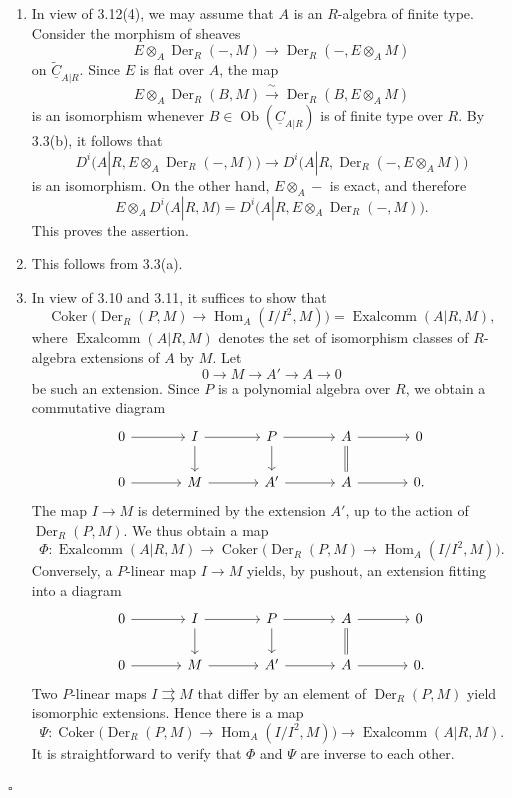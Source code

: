 \begin{enumerate}[label=(\arabic*)]
\item In view of 3.12(4), we may assume that $A$ is an
$R$-algebra of finite type. Consider the morphism of sheaves
\[
 E\otimes_A\operatorname{Der}_R(-,M)
 \longrightarrow
 \operatorname{Der}_R(-,E\otimes_AM)
\]
on $\widetilde{\underline C}_{A|R}$. Since $E$ is flat over $A$,
the map
\[
 E\otimes_A\operatorname{Der}_R(B,M)
 \xrightarrow{\ \sim\ }
 \operatorname{Der}_R(B,E\otimes_AM)
\]
is an isomorphism whenever
$B\in\operatorname{Ob}(\underline C_{A|R})$ is of finite type
over $R$. By 3.3(b), it follows that
\[
 D^i\bigl(A|R,E\otimes_A\operatorname{Der}_R(-,M)\bigr)
 \longrightarrow
 D^i\bigl(A|R,\operatorname{Der}_R(-,E\otimes_AM)\bigr)
\]
is an isomorphism. On the other hand,
$E\otimes_A-$ is exact, and therefore
\[
 E\otimes_AD^i(A|R,M)
 =D^i\bigl(A|R,E\otimes_A\operatorname{Der}_R(-,M)\bigr).
\]
This proves the assertion.

\item This follows from 3.3(a).


\item In view of 3.10 and 3.11, it suffices to show that
\[
 \operatorname{Coker}\bigl(
 \operatorname{Der}_R(P,M)\longrightarrow
 \operatorname{Hom}_A(I/I^2,M)\bigr)
 =\operatorname{Exalcomm}(A|R,M),
\]
where $\operatorname{Exalcomm}(A|R,M)$ denotes the set of
isomorphism classes of $R$-algebra extensions of $A$ by $M$.
Let
\[
 0\longrightarrow M\longrightarrow A'\longrightarrow A
 \longrightarrow0
\]
be such an extension. Since $P$ is a polynomial algebra over $R$,
we obtain a commutative diagram
\[
\begin{tikzcd}[column sep=large]
0 \arrow[r] & I \arrow[r] \arrow[d]
& P \arrow[r] \arrow[d]
& A \arrow[r] \arrow[d,equal] & 0 \\
0 \arrow[r] & M \arrow[r]
& A' \arrow[r]
& A \arrow[r] & 0.
\end{tikzcd}
\]
The map $I\longrightarrow M$ is determined by the extension $A'$,
up to the action of $\operatorname{Der}_R(P,M)$. We thus obtain a
map
\[
 \Phi:\operatorname{Exalcomm}(A|R,M)
 \longrightarrow
 \operatorname{Coker}\bigl(
 \operatorname{Der}_R(P,M)\longrightarrow
 \operatorname{Hom}_A(I/I^2,M)\bigr).
\]
Conversely, a $P$-linear map $I\longrightarrow M$ yields, by
pushout, an extension fitting into a diagram
\[
\begin{tikzcd}[column sep=large]
0 \arrow[r] & I \arrow[r] \arrow[d]
& P \arrow[r] \arrow[d]
& A \arrow[r] \arrow[d,equal] & 0 \\
0 \arrow[r] & M \arrow[r]
& A' \arrow[r]
& A \arrow[r] & 0.
\end{tikzcd}
\]
Two $P$-linear maps $I\rightrightarrows M$ that differ by an
element of $\operatorname{Der}_R(P,M)$ yield isomorphic
extensions. Hence there is a map
\[
 \Psi:\operatorname{Coker}\bigl(
 \operatorname{Der}_R(P,M)\longrightarrow
 \operatorname{Hom}_A(I/I^2,M)\bigr)
 \longrightarrow\operatorname{Exalcomm}(A|R,M).
\]
It is straightforward to verify that $\Phi$ and $\Psi$ are inverse
to each other.
\end{enumerate}
\hfill$\square$
